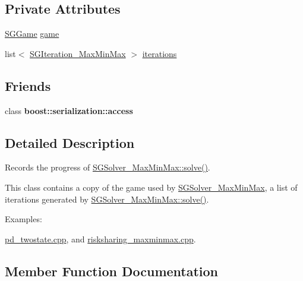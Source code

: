 \subsection*{Private Attributes}
\begin{DoxyCompactItemize}
\item 
\hyperlink{classSGGame}{S\+G\+Game} \hyperlink{classSGSolution__MaxMinMax_a5d4ad64f86fcd34f2e25ea06c17e6efc}{game}
\item 
list$<$ \hyperlink{classSGIteration__MaxMinMax}{S\+G\+Iteration\+\_\+\+Max\+Min\+Max} $>$ \hyperlink{classSGSolution__MaxMinMax_a119ccef307a2964b6b16e8ba2af547fd}{iterations}
\end{DoxyCompactItemize}
\subsection*{Friends}
\begin{DoxyCompactItemize}
\item 
\mbox{\label{classSGSolution__MaxMinMax_ac98d07dd8f7b70e16ccb9a01abf56b9c}} 
class {\bfseries boost\+::serialization\+::access}
\end{DoxyCompactItemize}


\subsection{Detailed Description}
Records the progress of \hyperlink{classSGSolver__MaxMinMax_aad121e84c1492524e439ffba05893f3d}{S\+G\+Solver\+\_\+\+Max\+Min\+Max\+::solve()}. 

This class contains a copy of the game used by \hyperlink{classSGSolver__MaxMinMax}{S\+G\+Solver\+\_\+\+Max\+Min\+Max}, a list of iterations generated by \hyperlink{classSGSolver__MaxMinMax_aad121e84c1492524e439ffba05893f3d}{S\+G\+Solver\+\_\+\+Max\+Min\+Max\+::solve()}. \begin{Desc}
\item[Examples\+: ]\par
\hyperlink{pd_twostate_8cpp-example}{pd\+\_\+twostate.\+cpp}, and \hyperlink{risksharing_maxminmax_8cpp-example}{risksharing\+\_\+maxminmax.\+cpp}.\end{Desc}


\subsection{Member Function Documentation}
\mbox{\label{classSGSolution__MaxMinMax_a486859659ba8ae3ee1d38403a158236a}} 
